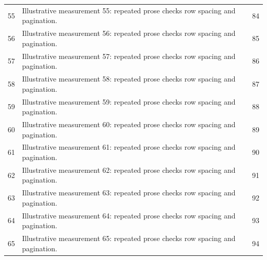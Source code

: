 \documentclass[algorithms,listings]{tempusreport}
\begin{document}
\begin{longtable}{@{}r >{\raggedright\arraybackslash}p{.62\linewidth} r@{}}
55 & Illustrative measurement 55: repeated prose checks row spacing and pagination. & 84 \\
56 & Illustrative measurement 56: repeated prose checks row spacing and pagination. & 85 \\
57 & Illustrative measurement 57: repeated prose checks row spacing and pagination. & 86 \\
58 & Illustrative measurement 58: repeated prose checks row spacing and pagination. & 87 \\
59 & Illustrative measurement 59: repeated prose checks row spacing and pagination. & 88 \\
60 & Illustrative measurement 60: repeated prose checks row spacing and pagination. & 89 \\
61 & Illustrative measurement 61: repeated prose checks row spacing and pagination. & 90 \\
62 & Illustrative measurement 62: repeated prose checks row spacing and pagination. & 91 \\
63 & Illustrative measurement 63: repeated prose checks row spacing and pagination. & 92 \\
64 & Illustrative measurement 64: repeated prose checks row spacing and pagination. & 93 \\
65 & Illustrative measurement 65: repeated prose checks row spacing and pagination. & 94 \\
\end{longtable}
\end{document}
